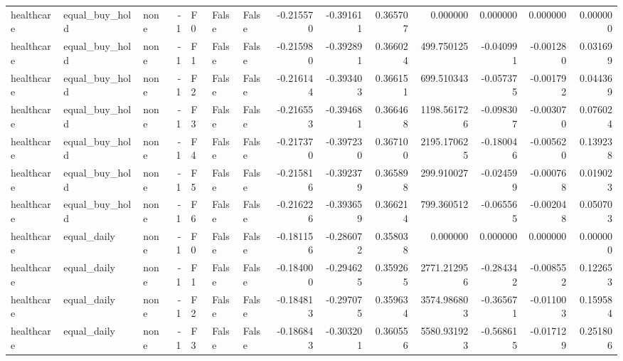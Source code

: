 \begin{tabular}{lllrlllrrrrrrr}
healthcare & equal\_buy\_hold &      none &    -1 &  F0 &           False &            False & -0.215570 & -0.391611 & 0.365707 &         0.000000 &           0.000000 &        0.000000 &            0.000000 \\
healthcare & equal\_buy\_hold &      none &    -1 &  F1 &           False &            False & -0.215980 & -0.392891 & 0.366024 &       499.750125 &          -0.040991 &       -0.001280 &            0.031699 \\
healthcare & equal\_buy\_hold &      none &    -1 &  F2 &           False &            False & -0.216144 & -0.393403 & 0.366151 &       699.510343 &          -0.057375 &       -0.001792 &            0.044369 \\
healthcare & equal\_buy\_hold &      none &    -1 &  F3 &           False &            False & -0.216553 & -0.394681 & 0.366468 &      1198.561726 &          -0.098307 &       -0.003070 &            0.076024 \\
healthcare & equal\_buy\_hold &      none &    -1 &  F4 &           False &            False & -0.217370 & -0.397230 & 0.367100 &      2195.170625 &          -0.180046 &       -0.005620 &            0.139238 \\
healthcare & equal\_buy\_hold &      none &    -1 &  F5 &           False &            False & -0.215816 & -0.392379 & 0.365898 &       299.910027 &          -0.024599 &       -0.000768 &            0.019023 \\
healthcare & equal\_buy\_hold &      none &    -1 &  F6 &           False &            False & -0.216226 & -0.393659 & 0.366214 &       799.360512 &          -0.065565 &       -0.002048 &            0.050703 \\
healthcare &    equal\_daily &      none &    -1 &  F0 &           False &            False & -0.181156 & -0.286072 & 0.358038 &         0.000000 &           0.000000 &        0.000000 &            0.000000 \\
healthcare &    equal\_daily &      none &    -1 &  F1 &           False &            False & -0.184000 & -0.294625 & 0.359265 &      2771.212956 &          -0.284342 &       -0.008552 &            0.122653 \\
healthcare &    equal\_daily &      none &    -1 &  F2 &           False &            False & -0.184813 & -0.297075 & 0.359634 &      3574.986803 &          -0.365671 &       -0.011003 &            0.159584 \\
healthcare &    equal\_daily &      none &    -1 &  F3 &           False &            False & -0.186843 & -0.303201 & 0.360556 &      5580.931923 &          -0.568615 &       -0.017129 &            0.251806 \\

\end{tabular}
